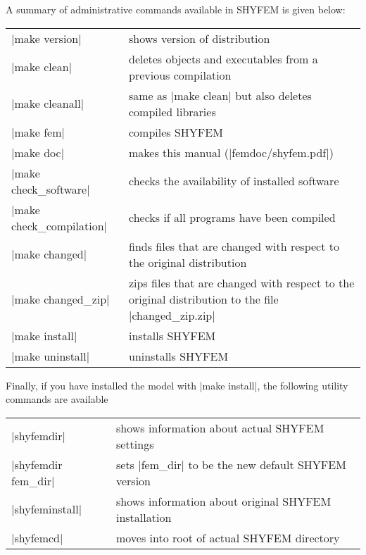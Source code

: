 A summary of administrative commands available in SHYFEM is given below: \vspace{0.5cm}

\begin{center}
\begin{tabular}{ l p{7cm} }
|make version|		&	shows version of distribution \\
|make clean|		&	deletes objects and executables from a previous
                        	compilation \\
|make cleanall|		&	same as |make clean| but also deletes 
				compiled libraries \\
|make fem|		&	compiles SHYFEM \\
|make doc|		&	makes this manual (|femdoc/shyfem.pdf|) \\
|make check_software|	&	checks the availability of installed software \\
|make check_compilation|&	checks if all programs have been compiled \\
|make changed|		&	finds files that are changed with respect to the
				original distribution \\
|make changed_zip|	&	zips files that are changed with respect to the
				original distribution to the file 
				|changed_zip.zip| \\
|make install|		&	installs SHYFEM \\
|make uninstall|	&	uninstalls SHYFEM \\
\end{tabular}
\end{center}

\vspace{0.5cm}
Finally, if you have installed the model with |make install|, 
the following utility commands are available \vspace{0.5cm}

\begin{center}
\begin{tabular}{ l l }
|shyfemdir|		&	shows information about actual SHYFEM
				settings \\
|shyfemdir fem_dir|	&	sets |fem_dir| to be the new default 
				SHYFEM version \\
|shyfeminstall|		&	shows information about original SHYFEM 
				installation \\
|shyfemcd|		&	moves into root of actual SHYFEM directory \\
\end{tabular}
\end{center}


